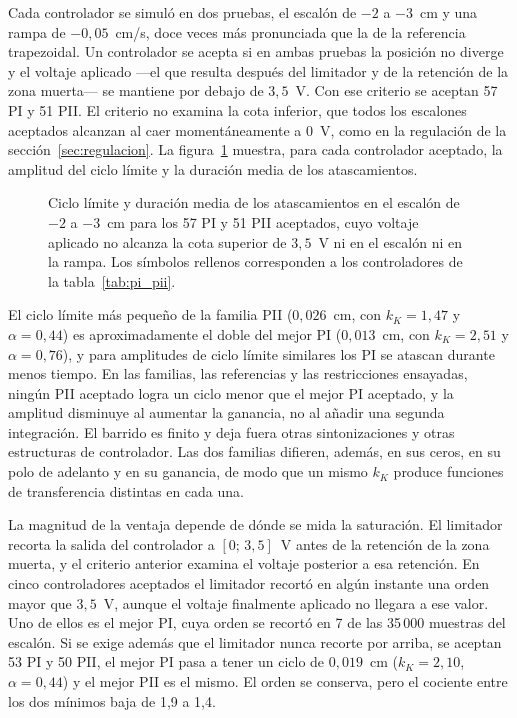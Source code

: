 Cada controlador se simuló en dos pruebas, el escalón de $-2$ a $-3$~cm y una rampa de $-0{,}05$~cm/s, doce veces más pronunciada que la de la referencia trapezoidal. Un controlador se acepta si en ambas pruebas la posición no diverge y el voltaje aplicado ---el que resulta después del limitador y de la retención de la zona muerta--- se mantiene por debajo de $3{,}5$~V. Con ese criterio se aceptan 57 PI y 51 PII. El criterio no examina la cota inferior, que todos los escalones aceptados alcanzan al caer momentáneamente a 0~V, como en la regulación de la sección~\ref{sec:regulacion}. La figura~\ref{fig:r15_familias} muestra, para cada controlador aceptado, la amplitud del ciclo límite y la duración media de los atascamientos.

\begin{figure}[ht]
    \centering
    
    \caption[Familias PI y PII]{Ciclo límite y duración media de los atascamientos en el escalón de $-2$ a $-3$~cm para los 57 PI y 51 PII aceptados, cuyo voltaje aplicado no alcanza la cota superior de $3{,}5$~V ni en el escalón ni en la rampa. Los símbolos rellenos corresponden a los controladores de la tabla~\ref{tab:pi_pii}.}
    \label{fig:r15_familias}
\end{figure}

El ciclo límite más pequeño de la familia PII ($0{,}026$~cm, con $k_K=1{,}47$ y $\alpha=0{,}44$) es aproximadamente el doble del mejor PI ($0{,}013$~cm, con $k_K=2{,}51$ y $\alpha=0{,}76$), y para amplitudes de ciclo límite similares los PI se atascan durante menos tiempo. En las familias, las referencias y las restricciones ensayadas, ningún PII aceptado logra un ciclo menor que el mejor PI aceptado, y la amplitud disminuye al aumentar la ganancia, no al añadir una segunda integración. El barrido es finito y deja fuera otras sintonizaciones y otras estructuras de controlador. Las dos familias difieren, además, en sus ceros, en su polo de adelanto y en su ganancia, de modo que un mismo $k_K$ produce funciones de transferencia distintas en cada una.

La magnitud de la ventaja depende de dónde se mida la saturación. El limitador recorta la salida del controlador a $[0;\,3{,}5]$~V antes de la retención de la zona muerta, y el criterio anterior examina el voltaje posterior a esa retención. En cinco controladores aceptados el limitador recortó en algún instante una orden mayor que $3{,}5$~V, aunque el voltaje finalmente aplicado no llegara a ese valor. Uno de ellos es el mejor PI, cuya orden se recortó en 7 de las 35\,000 muestras del escalón. Si se exige además que el limitador nunca recorte por arriba, se aceptan 53 PI y 50 PII, el mejor PI pasa a tener un ciclo de $0{,}019$~cm ($k_K=2{,}10$, $\alpha=0{,}44$) y el mejor PII es el mismo. El orden se conserva, pero el cociente entre los dos mínimos baja de 1,9 a 1,4.

